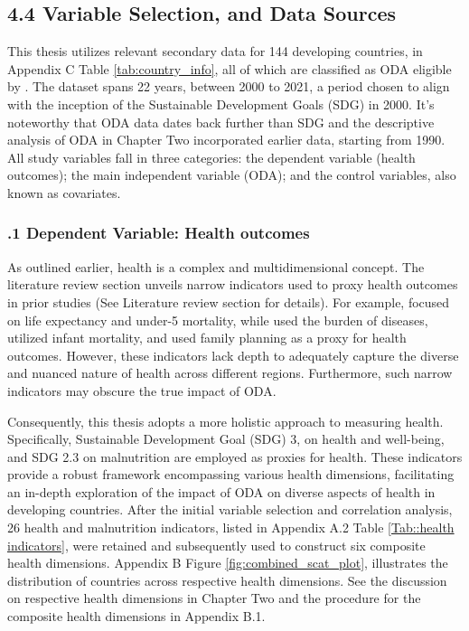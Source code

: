\subsection*{4.4 Variable Selection, and Data Sources}
This thesis utilizes relevant secondary data for 144 developing countries, in Appendix C Table \ref{tab:country_info}, all of which are classified as ODA eligible by \textcite{oecd_Data_2023}. The dataset spans  22 years, between 2000 to 2021, a period chosen to align with the inception of the Sustainable Development Goals (SDG) in 2000. It's noteworthy that ODA data dates back further than SDG and the descriptive analysis of ODA in Chapter Two incorporated earlier data, starting from 1990. All study variables fall in three categories: the dependent variable (health outcomes); the main independent variable (ODA); and the control variables, also known as covariates. 

\subsubsection*{.1 Dependent Variable: Health outcomes}
As outlined earlier, health is a complex and multidimensional concept. The literature review section unveils narrow indicators used to proxy health outcomes in prior studies (See Literature review section for details). For example, \textcite{nwude_official_2020} focused on life expectancy and under-5 mortality, while \textcite{odokonyero_impact_2018, bavinger_relationship_2017} used the burden of diseases, \textcite{doucouliagos_health_2021} utilized infant mortality, and \textcite{kavakli_us_2022} used family planning as a proxy for health outcomes. However, these indicators lack depth to adequately capture the diverse and nuanced nature of health across different regions. Furthermore, such narrow indicators may obscure the true impact of ODA.

Consequently, this thesis adopts a more holistic approach to measuring health. Specifically, Sustainable Development Goal (SDG) 3, on health and well-being, and SDG 2.3 on malnutrition are employed as proxies for health. These indicators provide a robust framework encompassing various health dimensions, facilitating an in-depth exploration of the impact of ODA on diverse aspects of health in developing countries. After the initial variable selection and correlation analysis, 26 health and malnutrition indicators, listed in Appendix A.2 Table \ref{Tab::health indicators}, were retained and subsequently used to construct six composite health dimensions. Appendix B Figure \ref{fig:combined_scat_plot}, illustrates the distribution of countries across respective health dimensions. See the discussion on respective health dimensions in Chapter Two and the procedure for the composite health dimensions in Appendix B.1.

